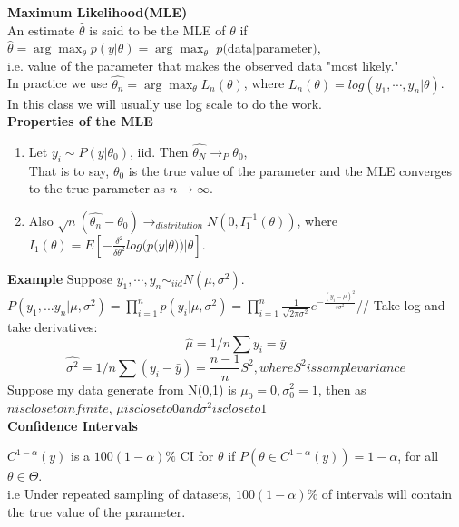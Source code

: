 \documentclass[12pt]{article}
\begin{document}
\textbf{Maximum Likelihood(MLE)}\\
An estimate $\hat{\theta}$ is said to be the MLE of $\theta$ if \\
$\hat{\theta}=\arg\max_\theta p(y|\theta)=\arg\max_\theta $ $p($data$|$parameter$)$, \\
i.e. value of the parameter that makes the  observed data "most likely." \\
In practice we use $\hat{\theta_n}=\arg\max_\theta L_n(\theta)$, where $L_n(\theta)=log(y_1,\cdots,y_n|\theta)$. \\
In this class we will usually use log scale to do the work.\\

\textbf{Properties of the MLE}
\begin{enumerate}
\item
Let $y_i \sim P(y|\theta_0)$, iid. Then $\hat{\theta_N} \rightarrow_P \theta_0$,\\
 That is to say, $\theta_0$ is the true value of the parameter and the MLE converges to the true parameter as $n \rightarrow \infty$.\\
\item
Also $\sqrt{n}(\hat{\theta_n}-\theta_0) \rightarrow_{distribution} N(0,I_1^{-1}(\theta))$, where $I_1(\theta)=E[-\frac{\delta^2}{\delta \theta^2} log(p(y|\theta))|\theta]$.\\
\end{enumerate}

\textbf{Example}
Suppose $y_1,\cdots,y_n \sim_{iid} N(\mu, \sigma^2)$.\\
$P(y_1,...y_n|\mu,\sigma^2)=\prod_{i=1}^np(y_i|\mu,\sigma^2)=\prod_{i=1}^n \frac{1}{\sqrt{2 \pi \sigma^2}} e^{-\frac{(y_i-\mu)^2}{s \sigma^2}}$//
Take log and take derivatives:
$$\hat{\mu}=1/n \sum y_i= \bar y$$
$$\hat{\sigma^2}=1/n \sum (y_i-\bar y)=\frac{n-1}{n} S^2, where S^2 is sample variance$$
Suppose my data generate from N(0,1) is $\mu_0=0, \sigma_0^2=1$, then as $n is close to infinite$, $\mu is close to 0 and \sigma^2 is close to 1$\\



\textbf{Confidence Intervals}

 $C^{1-\alpha}(y)$ is a $100(1-\alpha)\%$ CI for $\theta$ if $P(\theta \in C^{1-\alpha}(y))=1-\alpha$, for all $\theta \in \Theta$.\\
 i.e  Under repeated sampling of datasets, $100(1-\alpha)\%$ of intervals will contain the true value of the parameter.
\end{document}
